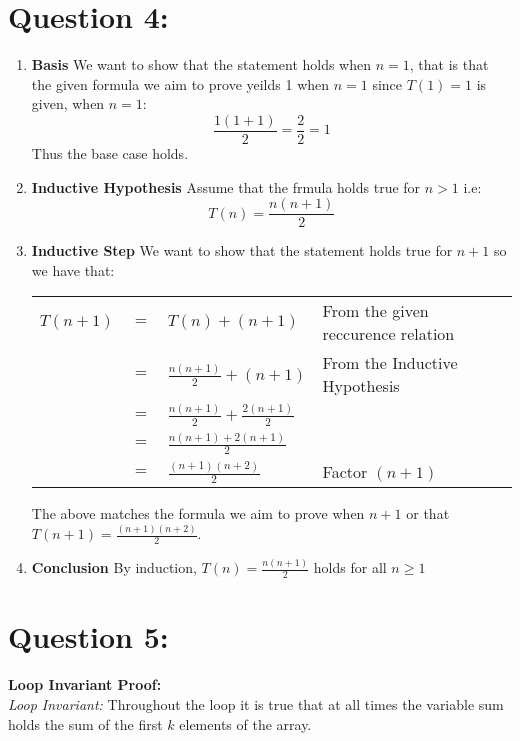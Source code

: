 \documentclass{article}
\begin{document}
\section*{Question 4:}
\begin{enumerate}[label=\roman*.]
  \item \textbf{Basis}\newline
  We want to show that the statement holds when $n=1$, that is that the given formula we aim to prove yeilds 1 when $n=1$ since $T(1)=1$ is given, when $n=1$: $$\frac{1(1+1)}{2}=\frac{2}{2}=1$$
  Thus the base case holds.
  \item \textbf{Inductive Hypothesis}\newline
  Assume that the frmula holds true for $n>1$ i.e: $$T(n)=\frac{n(n+1)}{2}$$
  \item \textbf{Inductive Step}\newline
  We want to show that the statement holds true for $n+1$ so we have that:
  \begin{table}[htp]
  \centering
  \begin{tabular}{ccll}
    $T(n+1)$ &  $=$ & $T(n)+(n+1)$  &  From the given reccurence relation \\
             &  $=$ & $\frac{n(n+1)}{2}+(n+1)$ & From the Inductive Hypothesis \\
             &  $=$ & $\frac{n(n+1)}{2}+\frac{2(n+1)}{2}$ & \\
             &  $=$ & $\frac{n(n+1)+2(n+1)}{2}$&  \\
             &  $=$ & $\frac{(n+1)(n+2)}{2}$& Factor $(n+1)$ \\
  \end{tabular}
  \end{table}
  The above matches the formula we aim to prove when $n+1$ or that $T(n+1)=\frac{(n+1)(n+2)}{2}$.

  \item \textbf{Conclusion}\newline
  By induction, $T(n)=\frac{n(n+1)}{2}$ holds for all $n\geq 1$
\end{enumerate}


\newpage
\section*{Question 5:}
\textbf{Loop Invariant Proof:}\\
\textit{Loop Invariant:} Throughout the loop it is true that at all times the variable sum holds the sum of the first $k$ elements of the array.
\end{document}
